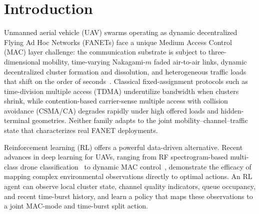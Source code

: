 
\section{Introduction}
\label{sec:introduction}

Unmanned aerial vehicle (UAV) swarms operating as dynamic decentralized Flying Ad Hoc Networks (FANETs) face a unique Medium Access Control (MAC) layer challenge: the communication substrate is subject to three-dimensional mobility, time-varying Nakagami-$m$ faded air-to-air links, dynamic decentralized cluster formation and dissolution, and heterogeneous traffic loads that shift on the order of seconds~\cite{li2024uavmac}. Classical fixed-assignment protocols such as time-division multiple access (TDMA) underutilize bandwidth when clusters shrink, while contention-based carrier-sense multiple access with collision avoidance (CSMA/CA) degrades rapidly under high offered loads and hidden-terminal geometries. Neither family adapts to the joint mobility--channel--traffic state that characterizes real FANET deployments.

Reinforcement learning (RL) offers a powerful data-driven alternative. Recent advances in deep learning for UAVs, ranging from RF spectrogram-based multi-class drone classification~\cite{cnn2026drone} to dynamic MAC control~\cite{zhao2025fanetrl}, demonstrate the efficacy of mapping complex environmental observations directly to optimal actions. An RL agent can observe local cluster state, channel quality indicators, queue occupancy, and recent time-burst history, and learn a policy that maps these observations to a joint MAC-mode and time-burst split action. 

